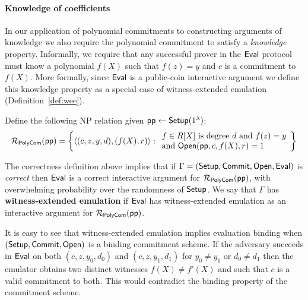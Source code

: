 \documentclass{article}
\theoremstyle{definition}
\begin{document}
\paragraph{Knowledge of coefficients} In our application of polynomial commitments to constructing arguments of knowledge we also require the polynomial commitment to satisfy a \emph{knowledge} property. Informally, we require that any successful prover in the $\textsf{{Eval}}$ protocol must know a polynomial $f(X)$ such that $f(z) = y$ and $c$ is a commitment to $f(X)$. More formally, since $\textsf{{Eval}}$ is a public-coin interactive argument we define this knowledge property as a special case of witness-extended emulation (Definition~\ref{def:wee}). 

Define the following NP relation given $\textsf{pp} \leftarrow \textsf{{Setup}}(1^\lambda)$: 
\[ 
\mathcal{R_\textsf{PolyCom}}(\textsf{pp}) = \left\{
\langle (c, z, y, d), (f(X), r) \rangle
: 
\begin{array}{l} 
f \in R[X] \ \text{is degree} \ d \ \text{and} \ f(z) = y \\ 
 \text{and} \ \textsf{{Open}}(\textsf{pp}, c, f(X), r) = 1 \\
\end{array}
\right\}
\] 

The correctness definition above implies that if $\Gamma = (\textsf{{Setup}}, \textsf{{Commit}}, \textsf{{Open}}, \textsf{{Eval}})$ is \emph{correct} then $\textsf{{Eval}}$ is a correct interactive argument for $\mathcal{R_\textsf{PolyCom}}(\textsf{pp})$, with overwhelming probability over the randomness of $\textsf{{Setup}}$. We say that $\Gamma$ has \textbf{witness-extended emulation} if $\textsf{{Eval}}$ has witness-extended emulation as an interactive argument for $\mathcal{R_\textsf{PolyCom}}(\textsf{pp})$. 

It is easy to see that witness-extended emulation implies evaluation binding when $(\textsf{{Setup}}, \textsf{{Commit}}, \textsf{{Open}})$ is a binding commitment scheme. If the adversary succeeds in $\textsf{{Eval}}$ on both $(c, z, y_0, d_0)$ and $(c, z, y_1, d_1)$ for $y_0 \neq y_1$ or $d_0 \neq d_1$ then the emulator obtains two distinct witnesses $f(X) \neq f'(X)$ and such that $c$ is a valid commitment to both. This would contradict the binding property of the commitment scheme. 


\end{document}

